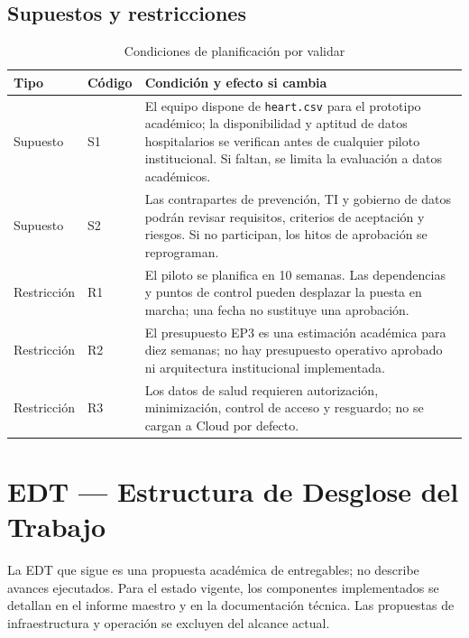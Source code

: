 \documentclass[12pt,a4paper]{article}
\begin{document}
\subsection{Supuestos y restricciones}

\begin{table}[H]
  \centering
  \caption{Condiciones de planificación por validar}
  \small
  \begin{tabularx}{\textwidth}{@{}p{2cm}p{1.3cm}X@{}}
    \toprule
    Tipo & Código & Condición y efecto si cambia \\
    \midrule
    Supuesto & S1 & El equipo dispone de \texttt{heart.csv} para el prototipo académico; la disponibilidad y aptitud de datos hospitalarios se verifican antes de cualquier piloto institucional. Si faltan, se limita la evaluación a datos académicos. \\
    Supuesto & S2 & Las contrapartes de prevención, TI y gobierno de datos podrán revisar requisitos, criterios de aceptación y riesgos. Si no participan, los hitos de aprobación se reprograman. \\
    Restricción & R1 & El piloto se planifica en 10 semanas. Las dependencias y puntos de control pueden desplazar la puesta en marcha; una fecha no sustituye una aprobación. \\
    Restricción & R2 & El presupuesto EP3 es una estimación académica para diez semanas; no hay presupuesto operativo aprobado ni arquitectura institucional implementada. \\
    Restricción & R3 & Los datos de salud requieren autorización, minimización, control de acceso y resguardo; no se cargan a Cloud por defecto. \\
    \bottomrule
  \end{tabularx}
\end{table}

\section{EDT --- Estructura de Desglose del Trabajo}

La EDT que sigue es una propuesta académica de entregables; no describe avances ejecutados. Para el estado vigente, los componentes implementados se detallan en el informe maestro y en la documentación técnica. Las propuestas de infraestructura y operación se excluyen del alcance actual.
\end{document}
